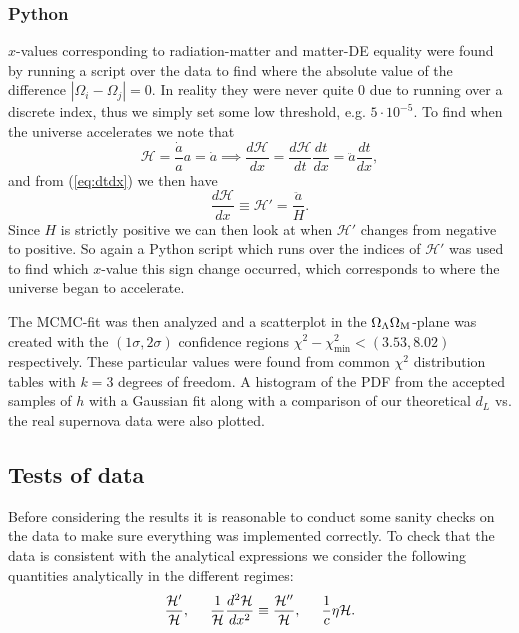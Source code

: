\documentclass[%
reprint,
 amsmath,amssymb,
 aps,
]{revtex4-2}
\newcommand{\Hp}{\mathcal{H}}
\begin{document}
\subsubsection{Python}
$x$-values corresponding to radiation-matter and matter-DE equality were found by running a script over the data to find where the absolute value of the difference $|\Omega_i-\Omega_j|=0$. In reality they were never quite 0 due to running over a discrete index, thus we simply set some low threshold, e.g. $5\cdot10^{-5}$. To find when the universe accelerates we note that
\[\Hp=\frac{\dot a}{a}a=\dot a\implies \frac{d\Hp}{dx}=\frac{d\Hp}{dt}\frac{dt}{dx}=\ddot{a}\frac{dt}{dx},\]
and from (\ref{eq:dtdx}) we then have
\[\frac{d\Hp}{dx}\equiv\Hp'=\frac{\ddot a}{H}.\]
Since $H$ is strictly positive we can then look at when $\Hp'$ changes from negative to positive. So again a Python script which runs over the indices of $\Hp'$ was used to find which $x$-value this sign change occurred, which corresponds to where the universe began to accelerate. 

The MCMC-fit was then analyzed and a scatterplot in the $\Omega_\Lambda\Omega_\text M$-plane was created with the $(1\sigma,2\sigma)$ confidence regions $\chi^2-\chi^2_\text{min}<(3.53,8.02)$ respectively. These particular values were found from common $\chi^2$ distribution tables with $k=3$ degrees of freedom. A histogram of the PDF  from the accepted samples of $h$ with a Gaussian fit along with a comparison of our theoretical $d_L$ vs. the real supernova data were also plotted.

\subsection{Tests of data}

Before considering the results it is reasonable to conduct some sanity checks on the data to make sure everything was implemented correctly. To check that the data is consistent with the analytical expressions we consider the following quantities analytically in the different regimes:
\[\frac{\Hp'}{\Hp},\hspace{5mm}\frac{1}{\Hp}\frac{d^2\Hp}{dx^2}\equiv\frac{\Hp''}{\Hp},\hspace{5mm}\frac{1}{c}\eta\Hp.\]
\end{document}
